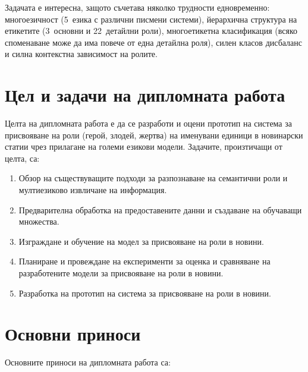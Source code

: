 \documentclass[12pt,a4paper]{report}
\begin{document}
Задачата е интересна, защото съчетава няколко трудности едновременно: многоезичност (5~езика с различни писмени системи), йерархична структура на етикетите (3~основни и 22~детайлни роли), многоетикетна класификация (всяко споменаване може да има повече от една детайлна роля), силен класов дисбаланс и силна контекстна зависимост на ролите.

\section{Цел и задачи на дипломната работа}

Целта на дипломната работа е да се разработи и оцени прототип на система за присвояване на роли (герой, злодей, жертва) на именувани единици в новинарски статии чрез прилагане на големи езикови модели. Задачите, произтичащи от целта, са:

\begin{enumerate}
  \item Обзор на съществуващите подходи за разпознаване на семантични роли и мултиезиково извличане на информация.
  \item Предварителна обработка на предоставените данни и създаване на обучаващи множества.
  \item Изграждане и обучение на модел за присвояване на роли в новини.
  \item Планиране и провеждане на експерименти за оценка и сравняване на разработените модели за присвояване на роли в новини.
  \item Разработка на прототип на система за присвояване на роли в новини.
\end{enumerate}

\section{Основни приноси}

Основните приноси на дипломната работа са:
\end{document}
